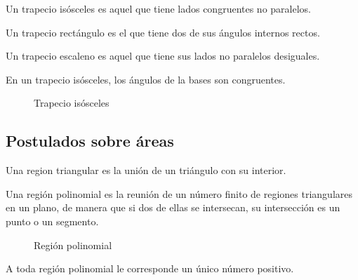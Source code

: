 \begin{definition}
    Un trapecio isósceles es aquel que tiene lados congruentes no paralelos.
\end{definition}

\begin{definition}
    Un trapecio rectángulo es el que tiene dos de sus ángulos internos rectos.    
\end{definition}

\begin{definition}
    Un trapecio escaleno es aquel que tiene sus lados no paralelos desiguales.
\end{definition}

\begin{theorem}
    En un trapecio isósceles, los ángulos de la bases son congruentes.

    \begin{figure}[!h]
        \centering
        
        \caption{Trapecio isósceles}
        \label{fig:theorem16}
    \end{figure}
    
\end{theorem}

\subsection{Postulados sobre áreas}

\begin{definition}
    Una region triangular es la unión de un triángulo con su interior.
\end{definition}

\begin{definition}
    Una región polinomial es la reunión de un número finito de regiones triangulares en un plano, de manera que si dos de ellas se intersecan, su intersección es un punto o un segmento.

    \begin{figure}[!h]
        \centering
        
        \caption{Región polinomial}
        \label{fig:region-polinomial}
    \end{figure}
    
\end{definition}

\begin{postulate}
    A toda región polinomial le corresponde un único número positivo.
\end{postulate}

